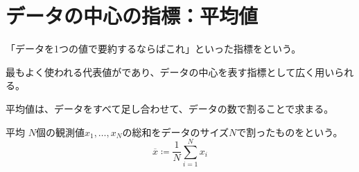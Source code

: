 \documentclass[../../../topic_statistics]{subfiles}
\begin{document}
\sectionline
\section{データの中心の指標：平均値}

「データを1つの値で要約するならばこれ」といった指標をという。

最もよく使われる代表値がであり、データの中心を表す指標として広く用いられる。

\br

平均値は、データをすべて足し合わせて、データの数で割ることで求まる。

\begin{definition}{平均}
  $N$個の観測値$x_1, \ldots, x_N$の総和をデータのサイズ$N$で割ったものをという。
  \begin{equation*}
    \overline{x} \coloneq \frac{1}{N} \sum_{i=1}^{N} x_i
  \end{equation*}
\end{definition}
\end{document}
